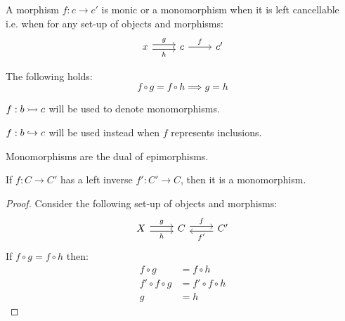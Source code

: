 \begin{definition}
  A morphism $f:c\to c'$ is monic or a monomorphism when it is left
  cancellable~\parencite[p.~19]{lane:working_mathematician} i.e. when for any
  set-up of objects and morphisms:
  \[\begin{tikzcd}[ampersand replacement=\&]
    x \& c \& {c'}
    \arrow["f", from=1-2, to=1-3]
    \arrow["g", shift left=1, from=1-1, to=1-2]
    \arrow["h"', shift right=1, from=1-1, to=1-2]
  \end{tikzcd}\]

  The following holds:
  \[f \circ g = f \circ h \implies g = h\]
\end{definition}

\begin{remark}
  $f:b\rightarrowtail c$ will be used to denote monomorphisms.
\end{remark}

\begin{remark}
  $f:b\hookrightarrow c$ will be used instead when $f$ represents inclusions.
\end{remark}

\begin{remark}
  Monomorphisms are the dual of epimorphisms.
\end{remark}

\begin{theorem}\label{thm:left_inverse_implies_mono}

  If $f:C\to C'$ has a left inverse $f':C'\to C$, then it is a monomorphism.

  \begin{proof}
    Consider the following set-up of objects and morphisms:
    \[
      \begin{tikzcd}[ampersand replacement=\&]
        X \& C \& {C'}
        \arrow["f", shift left=1, from=1-2, to=1-3]
        \arrow["g", shift left=1, from=1-1, to=1-2]
        \arrow["h"', shift right=1, from=1-1, to=1-2]
        \arrow["{f'}", shift left=1, from=1-3, to=1-2]
      \end{tikzcd}
    \]
    If $f\circ g = f\circ h$ then:
    \[
      \begin{aligned}
        f\circ g &= f\circ h\\
        f'\circ f \circ g &= f'\circ f\circ h\\
        g &= h
      \end{aligned}
    \]
  \end{proof}
  \vspace{-\baselineskip}
\end{theorem}

